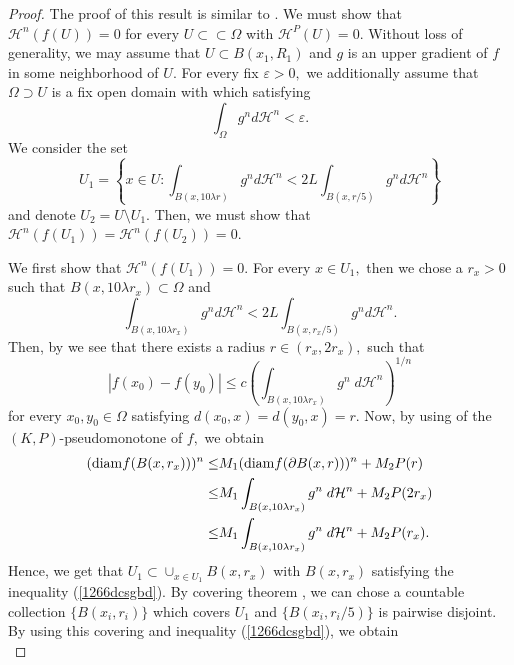 \documentclass[11pt,twoside]{article}
\theoremstyle{definition}
\theoremstyle{remark}
\newcommand{\abs}[1]{\left|#1\right|}
\begin{document}
\begin{proof}
The proof of this result is similar to \cite[Theorem 7.2]{HKST01}. We must show that $\mathcal{H}^{n}(f(U))=0$ for every $U\subset\subset\Omega$ with $\mathcal{H}^{P}(U)=0.$ Without loss of generality, we may assume that 
$U\subset B(x_{1}, R_{1})$ and $g$ is an upper gradient of $f$ in some neighborhood of $U.$  For every fix $\varepsilon>0,$ we additionally assume that $\Omega\supset U$ is a fix open domain with which satisfying 
 $$\int_{\Omega}g^{n}d\mathcal{H}^{n}<\varepsilon.$$
We consider the set 
$$U_{1}=\left\{x\in U: \int_{B(x,10\lambda r)}g^{n}d\mathcal{H}^{n}<2L\int_{B(x,r/5)}g^{n}d\mathcal{H}^{n}\right\}$$
and denote $U_{2}=U\setminus U_{1}.$ Then, we must show that $\mathcal{H}^{n}(f(U_{1}))=\mathcal{H}^{n}(f(U_{2}))=0.$

We first show that $\mathcal{H}^{n}(f(U_{1}))=0.$ For every $x\in U_{1},$ then we chose a $r_{x}>0$ such that $B(x,10 \lambda r_{x})\subset\Omega$ and 
$$\int_{B(x,10\lambda r_{x})}g^{n}d\mathcal{H}^{n}<2L\int_{B(x,r_{x}/5)}g^{n}d\mathcal{H}^{n}.$$
Then, by \cite[Theorem 7.1]{HK00} we see that  there exists a radius $r\in(r_{x},2r_{x}),$ such that 
\begin{equation}\label{dsfvgbd}
\abs{f(x_{0})-f(y_{0})}\leq c\left(\int_{B(x,10\lambda r_{x})}g^{n} \;d\mathcal{H}^{n}\right)^{1/n}
\end{equation}
for every $x_{0},y_{0}\in\Omega$ satisfying $d(x_{0},x)=d(y_{0},x)=r.$ Now, by using of the $(K,P)$-pseudomonotone of $f,$ we obtain
\begin{equation}\label{1266dcsgbd}
\begin{aligned}
({\rm diam}f(B(x,r_{x})))^{n}\leq& M_{1}({\rm diam}f(\partial B(x,r)))^{n}+M_{2}P(r)\\
\leq& M_{1}\int_{B(x,10\lambda r_{x})}g^{n} \;d\mathcal{H}^{n} +M_{2}P(2r_{x})\\
\leq& M_{1}\int_{B(x,10\lambda r_{x})}g^{n} \;d\mathcal{H}^{n} +M_{2}P(r_{x}).\\
\end{aligned}
\end{equation}
Hence, we get that $U_{1}\subset\cup_{x\in U_{1}}B(x,r_{x})$ with $B(x,r_{x})$ satisfying the inequality (\ref{1266dcsgbd}).  By covering theorem \cite[Chapter 1]{Hei01}, we can chose a countable collection
$\{B(x_{i},r_{i})\}$ which covers $U_{1}$ and $\{B(x_{i},r_{i}/5)\}$ is pairwise disjoint.
By using this covering and inequality (\ref{1266dcsgbd}), we obtain
\begin{equation}\label{12sdvv vd66dcsgbd}

\end{equation}
\end{proof}
\end{document}
